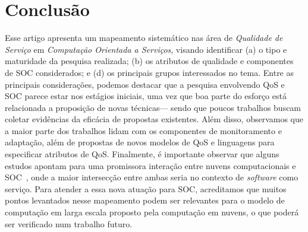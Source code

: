 \section{Conclus\~{a}o}\label{sec:conclusao}

Esse artigo apresenta um mapeamento sistem\'{a}tico nas \'{a}rea 
de \emph{Qualidade de Servi\c co} em \emph{Computa\c c\~{a}o Orientada a Servi\c cos}, visando identificar 
(a) o tipo e maturidade da pesquisa realizada; (b) os atributos de qualidade e componentes de SOC considerados; 
e (d) os principais grupos interessados no tema. Entre as principais considera\c c\~{o}es, podemos destacar que 
a pesquisa envolvendo QoS e SOC parece estar nos est\'{a}gios iniciais, uma vez que boa parte do esfor\c co est\'{a} 
relacionada a proposi\c c\~{a}o de novas t\'{e}cnicas--- sendo que poucos trabalhos buscam coletar evid\^{e}ncias 
da efic\'{a}cia de propostas existentes.  Al\'{e}m disso, observamos que a maior parte dos trabalhos lidam com 
os componentes de monitoramento e adapta\c c\~{a}o, al\'{e}m de propostas de novos modelos de QoS e linguagens para 
especificar atributos de QoS. 
Finalmente, \'{e} importante observar que alguns estudos apontam para uma promissora intera\c{c}\~{a}o entre nuvens computacionais e SOC~\cite{10.1109/MIC.2010.147}, onde a maior intersec\c{c}\~{a}o entre ambas seria no contexto de \emph{software} como serviço. Para atender a essa nova atua\c{c}\~{a}o para SOC, acreditamos que muitos pontos levantados nesse mapeamento podem ser relevantes para o modelo de computa\c{c}\~{a}o em larga escala proposto pela computação em nuvens, o que poderá ser verificado num trabalho futuro.